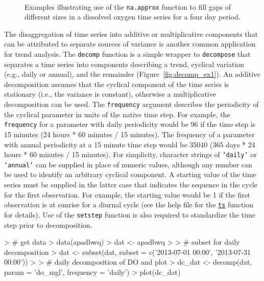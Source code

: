 \begin{figure}[!h]

{\centering \includegraphics[width=0.00\textwidth]{figure/interp_ex-1} 

}

\caption[Examples illustrating use of the \texttt{na.approx} function to fill gaps of different sizes in a dissolved oxygen time series for a four day period.]{Examples illustrating use of the \texttt{na.approx} function to fill gaps of different sizes in a dissolved oxygen time series for a four day period.}\label{fig:interp_ex}
\end{figure}

The disaggregation of time series into additive or multiplicative components that can be attributed to separate sources of variance is another common application for trend analysis.  The \texttt{decomp} function is a simple wrapper to \texttt{decompose} \cite{Kendall83} that separates a time series into components describing a trend, cyclical variation (e.g., daily or annual), and the remainder  (Figure~\ref{fig:decomp_ex1}).  An additive decomposition assumes that the cyclical component of the time series is stationary (i.e., the variance is constant), otherwise a multiplicative decomposition can be used.  The \texttt{frequency} argument describes the periodicity of the cyclical parameter in units of the native time step.  For example, the \texttt{frequency} for a parameter with daily periodicity would be 96 if the time step is 15 minutes (24 hours * 60 minutes / 15 minutes).  The frequency of a parameter with annual periodicity at a 15 minute time step would be 35040 (365 days * 24 hours * 60 minutes / 15 minutes).  For simplicity, character strings of \texttt{`daily'} or \texttt{`annual'} can be supplied in place of numeric values, although any number can be used to identify an arbitrary cyclical component.  A starting value of the time series must be supplied in the latter case that indicates the sequence in the cycle for the first observation.  For example, the starting value would be 1 if the first observation is at sunrise for a diurnal cycle (see the help file for the \href{https://stat.ethz.ch/R-manual/R-devel/library/stats/html/ts.html}{\texttt{ts}} function for details).  Use of the \texttt{setstep} function is also required to standardize the time step prior to decomposition.

\begin{example}
> # get data
> data(apadbwq)
> dat <- apadbwq
> 
> # subset for daily decomposition
> dat <- subset(dat, subset = c('2013-07-01 00:00', '2013-07-31 00:00'))
> 
> # daily decomposition of DO and plot
> dc_dat <- decomp(dat, param = 'do_mgl', frequency = 'daily')
> plot(dc_dat)
\end{example}

